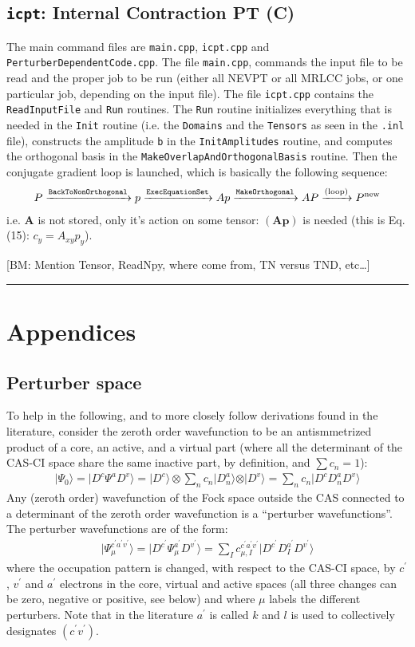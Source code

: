 \documentclass{article}
\newcommand  \todo[1]      {{\color{blue}[BM: #1]}}
\newcommand  \equ[2]       {\begin{align}#2\label{#1}\end{align}}
\renewcommand\b[1]         {\mathbf{#1}}
\newcommand  \var[1]       {\texttt{#1}}
\newcommand  \ket[1]       {\vert #1  \rangle}
\begin{document}
\subsection{\var{icpt}: Internal Contraction PT (C)}
\label{sec:icpt}

The main command files are \var{main.cpp}, \var{icpt.cpp} and \var{PerturberDependentCode.cpp}.
The file \var{main.cpp}, commands the input file to be read and the proper job to be run
(either all NEVPT or all MRLCC jobs, or one particular job, depending on the input file).
The file \var{icpt.cpp} contains the \var{ReadInputFile} and \var{Run} routines.
The \var{Run} routine initializes everything that is needed in the \var{Init} routine
(i.e. the \var{Domains} and the \var{Tensors} as seen in the \var{.inl} file),
constructs the amplitude \var{b} in the \var{InitAmplitudes} routine,
and computes the orthogonal basis in the \var{MakeOverlapAndOrthogonalBasis} routine.
Then the conjugate gradient loop is launched, which is basically the following sequence:
\equ{}{
  P
  \xrightarrow{\text{\var{BackToNonOrthogonal}}} p
  \xrightarrow{\text{\var{ExecEquationSet}}}     Ap
  \xrightarrow{\text{\var{MakeOrthogonal}}}      AP
  \xrightarrow{\text{(loop)}}
  P^\text{new}
}
i.e. $\b{A}$ is not stored, only it's action on some tensor: $(\b{A}\b{p})$ is needed
(this is Eq.(15): $c_y=A_{xy}p_y$).

\todo{Mention Tensor, ReadNpy, where come from, TN versus TND, etc\dots}

\vspace*{1em}\hrule\clearpage
\appendix
\section{Appendices}

\subsection{Perturber space}

To help in the following, and to more closely follow derivations found in the literature, consider the zeroth order wavefunction to be an antismmetrized product of a core, an active, and a virtual part
(where all the determinant of the CAS-CI space share the same inactive part, by definition, and $\sum c_n=1$):
\equ{ }{
  \ket{\Psi_0}=\ket{D^c \Psi^a D^v}=\ket{D^c}\otimes\sum_n c_n \ket{D^a_n}\otimes\ket{D^v}=\sum_n c_n \ket{D^c D^a_n D^v}
}
Any (zeroth order) wavefunction of the Fock space outside the CAS connected to a determinant of the zeroth order wavefunction is a ``perturber wavefunctions''.
The perturber wavefunctions are of the form:
\equ{ }{
  \ket{\Psi^{c^\prime a^\prime v^\prime}_\mu}=\ket{D^{c^\prime} \Psi^{a^\prime}_\mu D^{v^\prime}}=\sum_I c^{c^\prime a^\prime v^\prime}_{\mu,I} \ket{D^{c^\prime} D^{a^\prime}_I D^{v^\prime}}
}
where the occupation pattern is changed, with respect to the CAS-CI space, by $c^\prime$, $v^\prime$ and $a^\prime$ electrons in the core, virtual and active spaces
(all three changes can be zero, negative or positive, see below)
and where $\mu$ labels the different perturbers.
Note that in the literature $a^\prime$ is called $k$ and $l$ is used to collectively designates $(c^\prime v^\prime)$.
\end{document}
